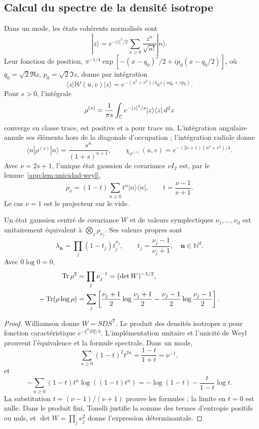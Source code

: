 \subsection{Calcul du spectre de la densité isotrope}
Dans un mode, les états cohérents normalisés sont
\[
 |z\rangle=e^{-|z|^2/2}\sum_{n\geq0}\frac{z^n}{\sqrt{n!}}|n\rangle.
\]
Leur fonction de position,
\(\pi^{-1/4}\exp[-(x-q_0)^2/2+ip_0(x-q_0/2)]\), où
\(q_0=\sqrt2\Re z\), \(p_0=\sqrt2\Im z\), donne par intégration
\[
 \langle z|\mathcal W(u,v)|z\rangle
 =e^{-(u^2+v^2)/4}e^{i(uq_0+vp_0)}.
\]
Pour \(s>0\), l’intégrale
\[
 \rho^{(s)}=\frac1{\pi s}\int_{\mathbb C} e^{-|z|^2/s}
 |z\rangle\langle z|\,d^2z
\]
converge en classe trace, est positive et a pour trace un. L’intégration
angulaire annule ses éléments hors de la diagonale d’occupation ; l’intégration
radiale donne
\[
 \langle n|\rho^{(s)}|n\rangle=\frac{s^n}{(1+s)^{n+1}},\qquad
 \chi_{\rho^{(s)}}(u,v)=e^{-(2s+1)(u^2+v^2)/4}.
\]
Avec \(\nu=2s+1\), l’unique état gaussien de covariance
\(\nu I_2\) est, par le lemme~\ref{app:lem:unicidad-weyl},
\begin{equation}
 \rho_\nu=(1-t)\sum_{n\geq0}t^n|n\rangle\langle n|,
 \qquad t=\frac{\nu-1}{\nu+1}.
 \label{app:eq:estado-geometrico}
\end{equation}
Le cas \(\nu=1\) est le projecteur sur le vide.

\begin{theorem}
\label{app:thm:espectro-gaussiano}
Un état gaussien centré de covariance \(W\) et de valeurs
symplectiques \(\nu_1,\ldots,\nu_d\) est unitairement équivalent
à \(\bigotimes_j\rho_{\nu_j}\). Ses valeurs propres sont
\[
 \lambda_{\symbf{n}}=\prod_j(1-t_j)t_j^{n_j},\qquad
 t_j=\frac{\nu_j-1}{\nu_j+1},\quad \symbf{n}\in\mathbb N^d.
\]
Avec \(0\log0=0\),
\begin{align}
 \operatorname{Tr}\rho^2&=\prod_j\nu_j^{-1}=(\det W)^{-1/2},
 \label{app:eq:pureza-general}\\
 -\operatorname{Tr}(\rho\log\rho)&=\sum_j
 \left[\frac{\nu_j+1}{2}\log\frac{\nu_j+1}{2}
 -\frac{\nu_j-1}{2}\log\frac{\nu_j-1}{2}\right].
 \label{app:eq:entropia-general}
\end{align}
\end{theorem}
\begin{proof}
Williamson donne \(W=SDS^{\mathsf T}\). Le produit des densités
isotropes a pour fonction caractéristique \(e^{-\xi^{\mathsf T}D\xi/4}\).
L’implémentation unitaire et l’unicité de Weyl prouvent
l’équivalence et la formule spectrale. Dans un mode,
\[
 \sum_{n\geq0}(1-t)^2t^{2n}=\frac{1-t}{1+t}=\nu^{-1},
\]
et
\[
 -\sum_{n\geq0}(1-t)t^n\log((1-t)t^n)
 =-\log(1-t)-\frac{t}{1-t}\log t.
\]
La substitution \(t=(\nu-1)/(\nu+1)\) prouve les formules ; la
limite en \(t=0\) est nulle. Dans le produit fini, Tonelli justifie
la somme des termes d’entropie positifs ou nuls, et
\(\det W=\prod_j\nu_j^2\) donne l’expression déterminantale.

\end{proof}

